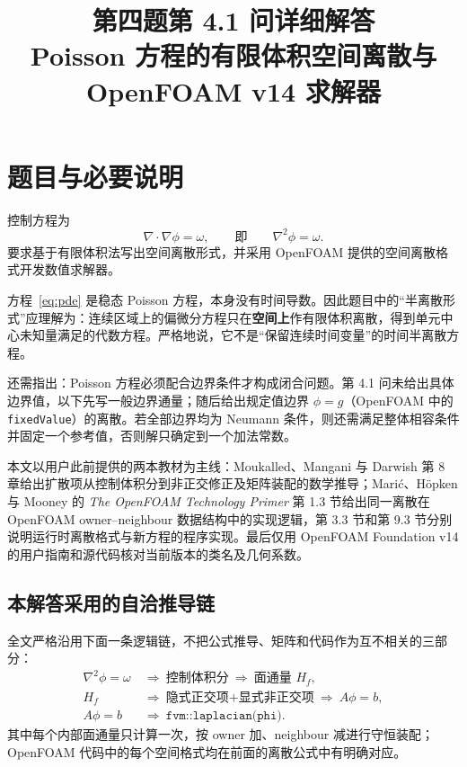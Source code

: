 \documentclass[UTF8,a4paper,11pt]{ctexart}
\title{第四题第 4.1 问详细解答\\[0.4em]
\large Poisson 方程的有限体积空间离散与 OpenFOAM v14 求解器}
\author{}
\date{}
\begin{document}
\maketitle

\section{题目与必要说明}

控制方程为
\begin{equation}
  \nabla\!\cdot\!\nabla\phi=\omega,
  \qquad\text{即}\qquad
  \nabla^2\phi=\omega .
  \label{eq:pde}
\end{equation}
要求基于有限体积法写出空间离散形式，并采用 OpenFOAM 提供的空间离散格式开发数值求解器。

方程~\eqref{eq:pde} 是稳态 Poisson 方程，本身没有时间导数。因此题目中的“半离散形式”应理解为：连续区域上的偏微分方程只在\textbf{空间上}作有限体积离散，得到单元中心未知量满足的代数方程。严格地说，它不是“保留连续时间变量”的时间半离散方程。

还需指出：Poisson 方程必须配合边界条件才构成闭合问题。第 4.1 问未给出具体边界值，以下先写一般边界通量；随后给出规定值边界
\(\phi=g\)（OpenFOAM 中的 \texttt{fixedValue}）的离散。若全部边界均为 Neumann 条件，则还需满足整体相容条件并固定一个参考值，否则解只确定到一个加法常数。

本文以用户此前提供的两本教材为主线：Moukalled、Mangani 与 Darwish 第 8 章给出扩散项从控制体积分到非正交修正及矩阵装配的数学推导\cite{Moukalled2016}；Mari\'{c}、H\"opken 与 Mooney 的 \textit{The OpenFOAM Technology Primer} 第 1.3 节给出同一离散在 OpenFOAM owner--neighbour 数据结构中的实现逻辑，第 3.3 节和第 9.3 节分别说明运行时离散格式与新方程的程序实现\cite{OFPrimer}。最后仅用 OpenFOAM Foundation v14 的用户指南和源代码核对当前版本的类名及几何系数\cite{OFGuide,OFfvmlap,OFcorrected,OFsurface,OFfixedValue}。

\subsection*{本解答采用的自洽推导链}

全文严格沿用下面一条逻辑链，不把公式推导、矩阵和代码作为互不相关的三部分：
\begin{equation*}
\boxed{
\begin{aligned}
\nabla^2\phi=\omega
&\ \Longrightarrow\ \text{控制体积分}
\ \Longrightarrow\ \text{面通量 }H_f,\\
H_f
&\ \Longrightarrow\ \text{隐式正交项+显式非正交项}
\ \Longrightarrow\ A\phi=b,\\
A\phi=b
&\ \Longrightarrow\ \texttt{fvm::laplacian(phi)}.
\end{aligned}}
\end{equation*}
其中每个内部面通量只计算一次，按 owner 加、neighbour 减进行守恒装配；OpenFOAM 代码中的每个空间格式均在前面的离散公式中有明确对应。
\end{document}
